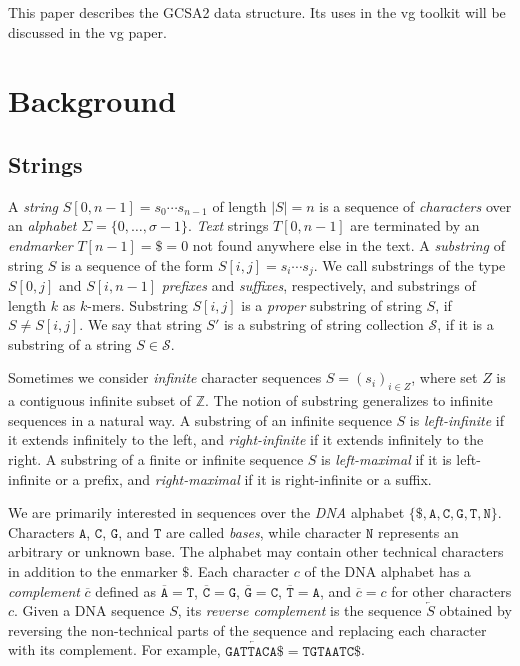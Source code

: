 \documentclass[twoside,leqno,twocolumn]{article}
\newcommand{\set}[1]{\ensuremath{\{ #1 \}}}
\newcommand{\abs}[1]{\ensuremath{\lvert #1 \rvert}}
\newcommand{\baseA}{\mathtt{A}}
\newcommand{\baseC}{\mathtt{C}}
\newcommand{\baseG}{\mathtt{G}}
\newcommand{\baseT}{\mathtt{T}}
\newcommand{\baseN}{\mathtt{N}}
\newcommand{\dnacomp}[1]{\ensuremath{\overline{#1}}}
\newcommand{\revcomp}[1]{\ensuremath{\overleftarrow{#1}}}
\newcommand{\kmer}[1]{$#1$\nobreakdash-mer}
\begin{document}
This paper describes the GCSA2 data structure. Its uses in the vg toolkit will be discussed in the vg paper.


\section{Background}

\subsection{Strings}\label{sect:strings}

A \emph{string} $S[0, n-1] = s_{0} \dotsm s_{n-1}$ of length $\abs{S} = n$ is a sequence of \emph{characters} over an \emph{alphabet} $\Sigma = \set{0, \dotsc, \sigma - 1}$. \emph{Text} strings $T[0, n-1]$ are terminated by an \emph{endmarker} $T[n-1] = \$ = 0$ not found anywhere else in the text. A \emph{substring} of string $S$ is a sequence of the form $S[i, j] = s_{i} \dotsm s_{j}$. We call substrings of the type $S[0, j]$ and $S[i, n-1]$ \emph{prefixes} and \emph{suffixes}, respectively, and substrings of length $k$ as \kmer{k}s. Substring $S[i, j]$ is a \emph{proper} substring of string $S$, if $S \ne S[i, j]$. We say that string $S'$ is a substring of string collection $\mathcal{S}$, if it is a substring of a string $S \in \mathcal{S}$.

Sometimes we consider \emph{infinite} character sequences $S = (s_{i})_{i \in Z}$, where set $Z$ is a contiguous infinite subset of $\mathbb{Z}$. The notion of substring generalizes to infinite sequences in a natural way. A substring of an infinite sequence $S$ is \emph{left-infinite} if it extends infinitely to the left, and \emph{right-infinite} if it extends infinitely to the right. A substring of a finite or infinite sequence $S$ is \emph{left-maximal} if it is left-infinite or a prefix, and \emph{right-maximal} if it is right-infinite or a suffix.

We are primarily interested in sequences over the \emph{DNA} alphabet $\set{\$, \baseA, \baseC, \baseG, \baseT, \baseN}$. Characters $\baseA$, $\baseC$, $\baseG$, and $\baseT$ are called \emph{bases}, while character $\baseN$ represents an arbitrary or unknown base. The alphabet may contain other technical characters in addition to the enmarker $\$$. Each character $c$ of the DNA alphabet has a \emph{complement} $\dnacomp{c}$ defined as $\dnacomp{\baseA} = \baseT$, $\dnacomp{\baseC} = \baseG$, $\dnacomp{\baseG} = \baseC$, $\dnacomp{\baseT} = \baseA$, and $\dnacomp{c} = c$ for other characters $c$. Given a DNA sequence $S$, its \emph{reverse complement} is the sequence $\revcomp{S}$ obtained by reversing the non-technical parts of the sequence and replacing each character with its complement. For example, $\revcomp{\mathtt{GATTACA}\$} = \mathtt{TGTAATC}\$$.
\end{document}
